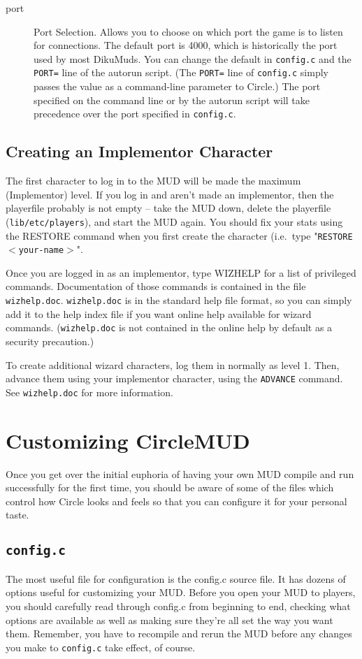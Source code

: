 \documentclass[11pt]{article}
\begin{document}
\begin{description}
\item[port] Port Selection.  Allows you to choose on which port the game is to listen for connections.  The default port is 4000, which is historically the port used by most DikuMuds.  You can change the default in \texttt{config.c} and the \texttt{PORT=} line of the autorun script.  (The \texttt{PORT=} line of \texttt{config.c} simply passes the value as a command-line parameter to Circle.)  The port specified on the command line or by the autorun script will take precedence over the port specified in \texttt{config.c}.
\end{description}

\subsection{Creating an Implementor Character}
The first character to log in to the MUD will be made the maximum (Implementor) level.  If you log in and aren't made an implementor, then the playerfile probably is not empty -- take the MUD down, delete the playerfile (\texttt{lib/etc/players}), and start the MUD again.  You should fix your stats using the RESTORE command when you first create the character (i.e.\ type "\texttt{RESTORE $<$your-name$>$}".
\par
Once you are logged in as an implementor, type WIZHELP for a list of privileged commands.  Documentation of those commands is contained in the file \texttt{wizhelp.doc}.  \texttt{wizhelp.doc} is in the standard help file format, so you can simply add it to the help index file if you want online help available for wizard commands.  (\texttt{wizhelp.doc} is not contained in the online help by
default as a security precaution.)
\par
To create additional wizard characters, log them in normally as level 1.  Then, advance them using your implementor character, using the \texttt{ADVANCE} command.  See \texttt{wizhelp.doc} for more information.

\section{Customizing CircleMUD}
Once you get over the initial euphoria of having your own MUD compile and run successfully for the first time, you should be aware of some of the files which control how Circle looks and feels so that you can configure it for your personal taste.

\subsection{\texttt{config.c}}
The most useful file for configuration is the config.c source file.  It has dozens of options useful for customizing your MUD.  Before you open your MUD to players, you should carefully read through config.c from beginning to end, checking what options are available as well as making sure they're all set the way you want them.  Remember, you have to recompile and rerun the MUD before any changes you make to \texttt{config.c} take effect, of course.
\end{document}
